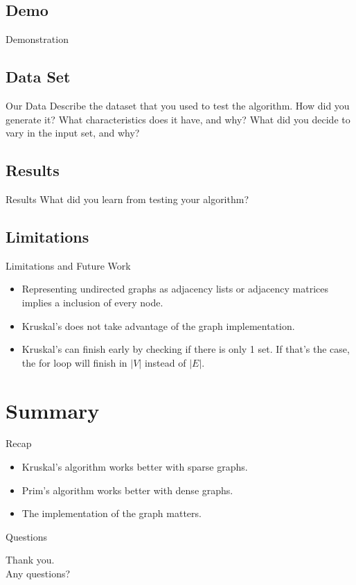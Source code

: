 \documentclass{beamer}
\begin{document}
\subsection{Demo}
\begin{frame}{Demonstration}
\end{frame}

\subsection{Data Set}
\begin{frame}{Our Data}
    Describe the dataset that you used to test the algorithm. How did you
    generate it? What characteristics does it have, and why? What did you
    decide to vary in the input set, and why?
\end{frame}

\subsection{Results}
\begin{frame}{Results}
    What did you learn from testing your algorithm?
\end{frame}

\subsection{Limitations}
\begin{frame}{Limitations and Future Work}
    \begin{itemize}
    \item Representing undirected graphs as adjacency lists or adjacency
    matrices implies a inclusion of every node.
    \item Kruskal's does not take advantage of the graph implementation.
    \item Kruskal's can finish early by checking if there is only 1 set. If
    that's the case, the for loop will finish in $|V|$ instead of $|E|$.
    \end{itemize}
\end{frame}


\section{Summary}\frame{\sectionpage}
\begin{frame}{Recap}
    \begin{itemize}
    \item Kruskal's algorithm works better with sparse graphs.
    \item Prim's algorithm works better with dense graphs.
    \item The implementation of the graph matters.
    \end{itemize}
\end{frame}

\begin{frame}{Questions}
    \begin{center}
    Thank you.\\
    Any questions?
    \end{center}
\end{frame}
\end{document}
